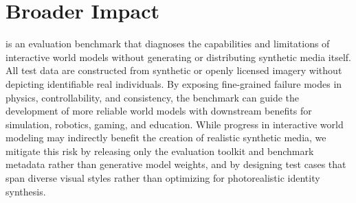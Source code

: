 

\section{Broader Impact}
\label{app:broader_impact}

\benchmark is an evaluation benchmark that diagnoses the capabilities and limitations of interactive world models without generating or distributing synthetic media itself. All test data are constructed from synthetic or openly licensed imagery without depicting identifiable real individuals. By exposing fine-grained failure modes in physics, controllability, and consistency, the benchmark can guide the development of more reliable world models with downstream benefits for simulation, robotics, gaming, and education. While progress in interactive world modeling may indirectly benefit the creation of realistic synthetic media, we mitigate this risk by releasing only the evaluation toolkit and benchmark metadata rather than generative model weights, and by designing test cases that span diverse visual styles rather than optimizing for photorealistic identity synthesis.
